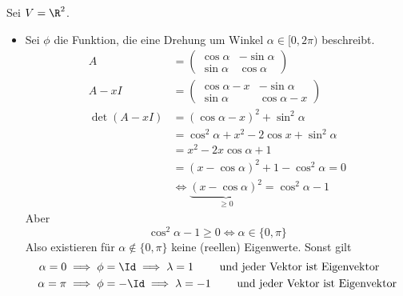 \documentclass{mycourse}
\begin{document}
\begin{ex}
Sei $V=\R^2$.
\begin{itemize}
\item
 Sei $\phi$ die Funktion, die eine Drehung um Winkel $\alpha \in [0,2\pi)$ beschreibt.
\begin{align*}
A&=\begin{pmatrix}\cos \alpha & -\sin\alpha\\ \sin \alpha &\cos \alpha\end{pmatrix}\\
A-x I&=\begin{pmatrix}\cos \alpha -x  & -\sin\alpha\\ \sin \alpha &\cos \alpha -x\end{pmatrix}\\
\det(A-xI)&=(\cos \alpha -x)^2+\sin^2\alpha\\
&=\cos^2\alpha +x^2-2\cos x+\sin^2 \alpha\\
&=x^2-2x\cos \alpha + 1\\
&=(x-\cos\alpha)^2+1-\cos^2\alpha=0\\
&\iff \underbrace{(x-\cos \alpha)^2}_{\ge 0}=\cos^2\alpha - 1
\end{align*}
Aber
\[
\cos^2\alpha-1\ge 0 \iff \alpha\in\{0,\pi\}
\]
Also existieren für $\alpha\not\in\{0,\pi\}$ keine (reellen) Eigenwerte.
Sonst gilt
\begin{align*}
\alpha=0&\implies \phi=\Id \implies \lambda=1 \qquad \text{ und jeder Vektor ist Eigenvektor} \\
\alpha=\pi&\implies \phi=-\Id \implies \lambda=-1 \qquad \text{ und jeder Vektor ist Eigenvektor}
\end{align*}


\end{itemize}
\end{ex}
\end{document}
